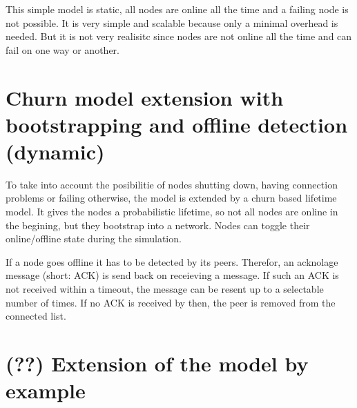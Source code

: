 This simple model is static, all nodes are online all the time and a failing node is not possible. It is very simple and scalable because only a minimal overhead is needed. But it is not very realisitc since nodes are not online all the time and can fail on one way or another.


\section{Churn model extension with bootstrapping and offline detection (dynamic)}

To take into account the posibilitie of nodes shutting down, having connection problems or failing otherwise, the model is extended by a churn based lifetime model. It gives the nodes a probabilistic lifetime, so not all nodes are online in the begining, but they bootstrap into a network. Nodes can toggle their online/offline state during the simulation.

If a node goes offline it has to be detected by its peers. Therefor, an acknolage message (short: ACK) is send back on receieving a message. If such an ACK is not received within a timeout, the message can be resent up to a selectable number of times. If no ACK is received by then, the peer is removed from the connected list.

\section{(??) Extension of the model by example}
